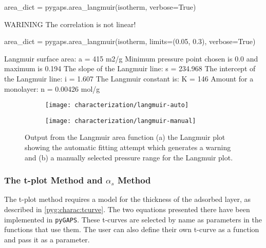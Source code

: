 \begin{samepage}
	\begin{python}[caption={Calculating a Langmuir area},label={pyg:lst:langmuirarea}]
area_dict = pygaps.area_langmuir(isotherm, verbose=True)
\end{python}
	\begin{pythonout}
WARINING The correlation is not linear!
\end{pythonout}
	\begin{python}
area_dict = pygaps.area_langmuir(isotherm, 
                                 limits=(0.05, 0.3), 
                                 verbose=True)
\end{python}
	\begin{pythonout}
Langmuir surface area: 	a = 415 m2/g
Minimum pressure point chosen is 0.0 and maximum is 0.194
The slope of the Langmuir line: 		s = 234.968
The intercept of the Langmuir line: 	i = 1.607
The Langmuir constant is:				K = 146
Amount for a monolayer: 				n = 0.00426 mol/g
\end{pythonout}
\end{samepage}

\begin{figure}[!htb]
	\centering

	\begin{subfigure}{0.45\linewidth}
		\parbox[c]{0.1\linewidth}{\caption{}%
			\label{pyg:fgr:langmuirarea-auto}}
		\parbox[b]{0.85\linewidth}{%
			\texttt{[image: characterization/langmuir-auto]}}
	\end{subfigure}%
	\begin{subfigure}{0.45\linewidth}
		\parbox[c]{0.1\linewidth}{\caption{}%
			\label{pyg:fgr:langmuirarea-manual}}
		\parbox[b]{0.85\linewidth}{%
			\texttt{[image: characterization/langmuir-manual]}}
	\end{subfigure}%

	\caption{Output from the Langmuir area function (a) the Langmuir plot
		showing the automatic fitting attempt which generates a warning and (b) a manually
		selected pressure range for the Langmuir plot.}%
	\label{pyg:fgr:langmuirarea}

\end{figure}

\subsubsection{The t-plot Method and \(\alpha_s\) Method}

The t-plot method requires a model for the thickness of 
the adsorbed layer, as described in \autoref{pyg:charac:tcurve}.
The two equations presented there have been implemented in \texttt{pyGAPS}.
These t-curves are selected by name as parameters in
the functions that use them. The user can also define their
own t-curve as a function and pass it as a parameter.

